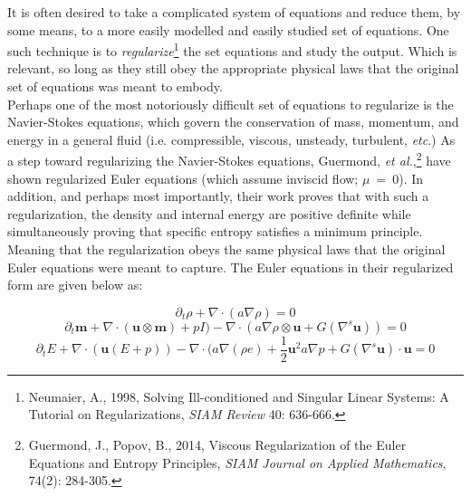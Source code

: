 \documentclass{article}
\begin{document}




\bigskip
It is often desired to take a complicated system of equations and reduce them,
 by some means, to a more easily modelled and easily studied set of equations.  
 One such technique is to \textit{regularize}\footnote{Neumaier, A., 1998, Solving
 Ill-conditioned and Singular Linear Systems: A Tutorial on Regularizations, {\em SIAM Review} 40: 636-666.}
 the set equations and study the
 output.  Which is relevant, so long as they still obey the appropriate physical
 laws that the original set of equations was meant to embody.
\\

Perhaps one of the most notoriously difficult set of equations to regularize is
the Navier-Stokes equations, which govern the conservation of mass, momentum,
and energy in a general fluid (i.e. compressible, viscous, unsteady, turbulent, \textit{etc}.)
 As a step toward regularizing the Navier-Stokes equations, Guermond, {\em et al.},\footnote{Guermond, J., Popov, B., 2014,
     Viscous Regularization of the Euler Equations and Entropy Principles,
 {\em SIAM Journal on Applied Mathematics}, 74(2): 284-305.}
 have shown regularized Euler equations (which assume inviscid flow; $\mu~=~0$).
 In addition, and perhaps most importantly, their work proves that with such a 
 regularization, the density and internal energy are positive definite while
 simultaneously proving that specific entropy satisfies a minimum principle. 
 Meaning that the regularization obeys the same physical laws that the original
 Euler equations were meant to capture. The Euler equations in their regularized form
 are given below as:

\begin{equation}
    \partial_t \rho + \nabla \cdot (a \nabla \rho) = 0
\end{equation}
\begin{equation}
    \partial_t \mathbf{m} + \nabla \cdot(\mathbf{u} \otimes \mathbf{m}) + pI) - \nabla\cdot(a\nabla\rho \otimes
    \mathbf{u} + G(\nabla^s\mathbf{u})) = 0
\end{equation}
\begin{equation}
    \partial_t E + \nabla \cdot (\mathbf{u}(E + p)) - \nabla \cdot (a\nabla(\rho e) + \frac{1}{2} \mathbf{u}^2 a \nabla p + G(\nabla^s\mathbf{u}) \cdot \mathbf{u} = 0
\end{equation}
\end{document}

